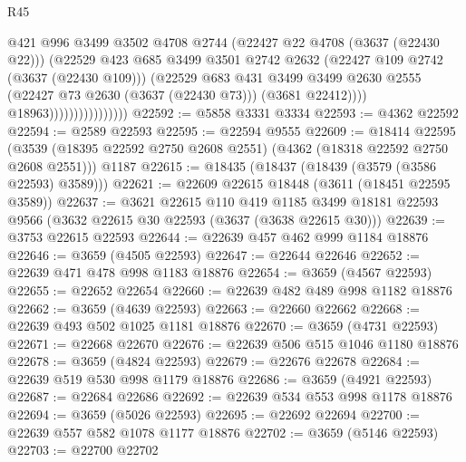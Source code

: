 \begin{lexlean}{R45}
\begin{coremodule}
                                      @421
                                      @996
                                      @3499
                                      @3502
                                      @4708
                                      @2744
                                      (@22427 @22 @4708 (@3637 (@22430 @22)))
                                      (@22529
                                        @423
                                        @685
                                        @3499
                                        @3501
                                        @2742
                                        @2632
                                        (@22427 @109 @2742 (@3637 (@22430 @109)))
                                        (@22529
                                          @683
                                          @431
                                          @3499
                                          @3499
                                          @2630
                                          @2555
                                          (@22427 @73 @2630 (@3637 (@22430 @73)))
                                          (@3681 @22412))))
                                    @18963))))))))))))))))
@22592 := @5858 @3331 @3334
@22593 := @4362 @22592
@22594 := @2589 @22593
@22595 := @22594 @9555
@22609 := @18414
    @22595
    (@3539 (@18395 @22592 @2750 @2608 @2551) (@4362 (@18318 @22592 @2750 @2608 @2551)))
    @1187
@22615 := @18435 (@18437 (@18439 (@3579 (@3586 @22593) @3589)))
@22621 := @22609 @22615 @18448 (@3611 (@18451 @22595 @3589))
@22637 := @3621
    @22615
    @110
    @419
    @1185
    @3499
    @18181
    @22593
    @9566
    (@3632 @22615 @30 @22593 (@3637 (@3638 @22615 @30)))
@22639 := @3753 @22615 @22593
@22644 := @22639 @457 @462 @999 @1184 @18876
@22646 := @3659 (@4505 @22593)
@22647 := @22644 @22646
@22652 := @22639 @471 @478 @998 @1183 @18876
@22654 := @3659 (@4567 @22593)
@22655 := @22652 @22654
@22660 := @22639 @482 @489 @998 @1182 @18876
@22662 := @3659 (@4639 @22593)
@22663 := @22660 @22662
@22668 := @22639 @493 @502 @1025 @1181 @18876
@22670 := @3659 (@4731 @22593)
@22671 := @22668 @22670
@22676 := @22639 @506 @515 @1046 @1180 @18876
@22678 := @3659 (@4824 @22593)
@22679 := @22676 @22678
@22684 := @22639 @519 @530 @998 @1179 @18876
@22686 := @3659 (@4921 @22593)
@22687 := @22684 @22686
@22692 := @22639 @534 @553 @998 @1178 @18876
@22694 := @3659 (@5026 @22593)
@22695 := @22692 @22694
@22700 := @22639 @557 @582 @1078 @1177 @18876
@22702 := @3659 (@5146 @22593)
@22703 := @22700 @22702

\end{coremodule}
\end{lexlean}
